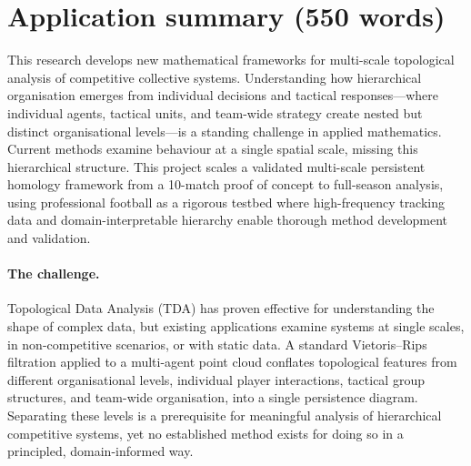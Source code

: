 \section{Application summary (550 words)}

This research develops new mathematical frameworks for multi-scale topological analysis of competitive collective systems. Understanding how hierarchical organisation emerges from individual decisions and tactical responses---where individual agents, tactical units, and team-wide strategy create nested but distinct organisational levels---is a standing challenge in applied mathematics. Current methods examine behaviour at a single spatial scale, missing this hierarchical structure. This project scales a validated multi-scale persistent homology framework from a 10-match proof of concept to full-season analysis, using professional football as a rigorous testbed where high-frequency tracking data and domain-interpretable hierarchy enable thorough method development and validation.

\paragraph{The challenge.}
Topological Data Analysis (TDA) has proven effective for understanding the shape of complex data, but existing applications examine systems at single scales, in non-competitive scenarios, or with static data. A standard Vietoris--Rips filtration applied to a multi-agent point cloud conflates topological features from different organisational levels, individual player interactions, tactical group structures, and team-wide organisation, into a single persistence diagram. Separating these levels is a prerequisite for meaningful analysis of hierarchical competitive systems, yet no established method exists for doing so in a principled, domain-informed way.


